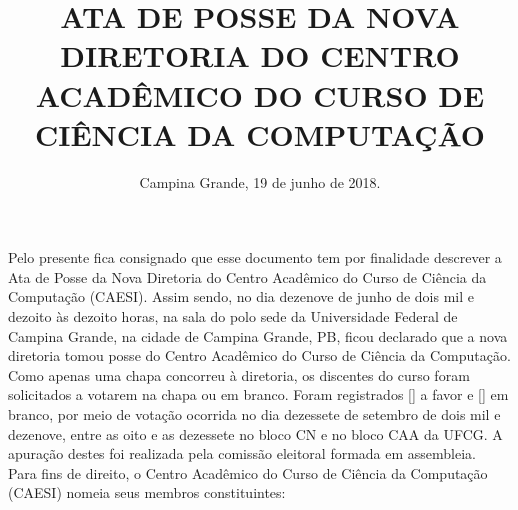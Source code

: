 \documentclass[11pt,letterpaper]{article}
\begin{document}
\title{ ATA DE POSSE DA NOVA DIRETORIA DO CENTRO ACADÊMICO DO CURSO DE CIÊNCIA DA COMPUTAÇÃO }
\date{Campina Grande, 19 de junho de 2018.}
\maketitle

Pelo presente fica consignado que esse documento tem por finalidade descrever a Ata de Posse da Nova Diretoria do Centro Acadêmico do Curso de Ciência da Computação (CAESI). Assim sendo, no dia dezenove de junho de dois mil e dezoito às dezoito horas, na sala do polo sede da Universidade Federal de Campina Grande, na cidade de Campina Grande, PB, ficou declarado que a nova diretoria tomou posse do Centro Acadêmico do Curso de Ciência da Computação. \\

Como apenas uma chapa concorreu à diretoria, os discentes do curso foram solicitados a votarem na chapa ou em branco. Foram registrados [] a favor e [] em branco, por meio de votação ocorrida no dia dezessete de setembro de dois mil e dezenove, entre as oito e as dezessete no bloco CN e no bloco CAA da UFCG. A apuração destes foi realizada pela comissão eleitoral formada em assembleia. \\

Para fins de direito, o Centro Acadêmico do Curso de Ciência da Computação (CAESI) nomeia seus membros constituintes:\\
\end{document}

